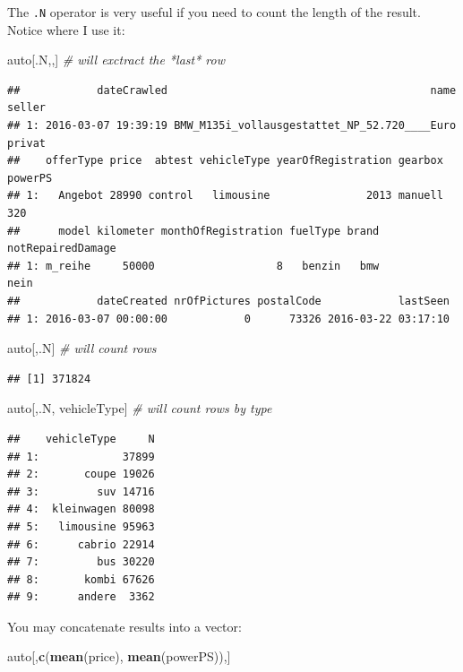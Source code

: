 \documentclass[]{book}
\newenvironment{Shaded}{\begin{snugshade}}{\end{snugshade}}
\newcommand{\CommentTok}[1]{\textcolor[rgb]{0.56,0.35,0.01}{\textit{#1}}}
\newcommand{\KeywordTok}[1]{\textcolor[rgb]{0.13,0.29,0.53}{\textbf{#1}}}
\newcommand{\NormalTok}[1]{#1}
\theoremstyle{definition}
\theoremstyle{definition}
\theoremstyle{definition}
\theoremstyle{remark}
\begin{document}
The \texttt{.N} operator is very useful if you need to count the length of the result.
Notice where I use it:

\begin{Shaded}
\begin{Highlighting}[]
\NormalTok{auto[.N,,] }\CommentTok{# will exctract the *last* row}
\end{Highlighting}
\end{Shaded}

\begin{verbatim}
##            dateCrawled                                         name seller
## 1: 2016-03-07 19:39:19 BMW_M135i_vollausgestattet_NP_52.720____Euro privat
##    offerType price  abtest vehicleType yearOfRegistration gearbox powerPS
## 1:   Angebot 28990 control   limousine               2013 manuell     320
##      model kilometer monthOfRegistration fuelType brand notRepairedDamage
## 1: m_reihe     50000                   8   benzin   bmw              nein
##            dateCreated nrOfPictures postalCode            lastSeen
## 1: 2016-03-07 00:00:00            0      73326 2016-03-22 03:17:10
\end{verbatim}

\begin{Shaded}
\begin{Highlighting}[]
\NormalTok{auto[,.N] }\CommentTok{# will count rows}
\end{Highlighting}
\end{Shaded}

\begin{verbatim}
## [1] 371824
\end{verbatim}

\begin{Shaded}
\begin{Highlighting}[]
\NormalTok{auto[,.N, vehicleType] }\CommentTok{# will count rows by type}
\end{Highlighting}
\end{Shaded}

\begin{verbatim}
##    vehicleType     N
## 1:             37899
## 2:       coupe 19026
## 3:         suv 14716
## 4:  kleinwagen 80098
## 5:   limousine 95963
## 6:      cabrio 22914
## 7:         bus 30220
## 8:       kombi 67626
## 9:      andere  3362
\end{verbatim}

You may concatenate results into a vector:

\begin{Shaded}
\begin{Highlighting}[]
\NormalTok{auto[,}\KeywordTok{c}\NormalTok{(}\KeywordTok{mean}\NormalTok{(price), }\KeywordTok{mean}\NormalTok{(powerPS)),]}
\end{Highlighting}
\end{Shaded}
\end{document}
